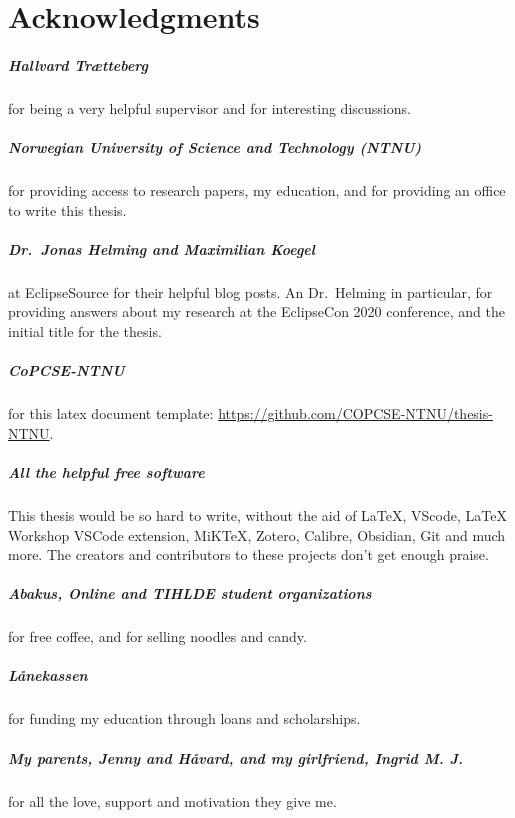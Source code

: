 \cleardoublepage{} %
\chapter*{Acknowledgments}

\paragraph*{Hallvard Trætteberg} for being a very helpful supervisor
and for interesting discussions.

\paragraph*{Norwegian University of Science and Technology (NTNU)} for providing access to research papers, my education, and for providing an office to write this thesis. 

\paragraph*{Dr.\ Jonas Helming and Maximilian Koegel} at EclipseSource for their helpful blog posts. An Dr.\ Helming in particular, for providing answers about my research at the EclipseCon 2020 conference, and the initial title for the thesis.

\paragraph*{CoPCSE-NTNU} for this latex document template: \href{https://github.com/COPCSE-NTNU/thesis-NTNU}{https://github.com/COPCSE-NTNU/thesis-NTNU}.

\paragraph*{All the helpful free software} This thesis would be so hard to write,
without the aid of \LaTeX, VScode, LaTeX Workshop VSCode extension, MiKTeX, Zotero, Calibre, Obsidian, Git and much more.
The creators and contributors to these projects don't get enough praise.

\paragraph*{Abakus, Online and TIHLDE student organizations} for free coffee, and for selling noodles and candy.

\paragraph*{Lånekassen} for funding my education through loans and scholarships.

\paragraph*{My parents, Jenny and Håvard, and my girlfriend, Ingrid M. J.} for all the love, support and motivation they give me.



